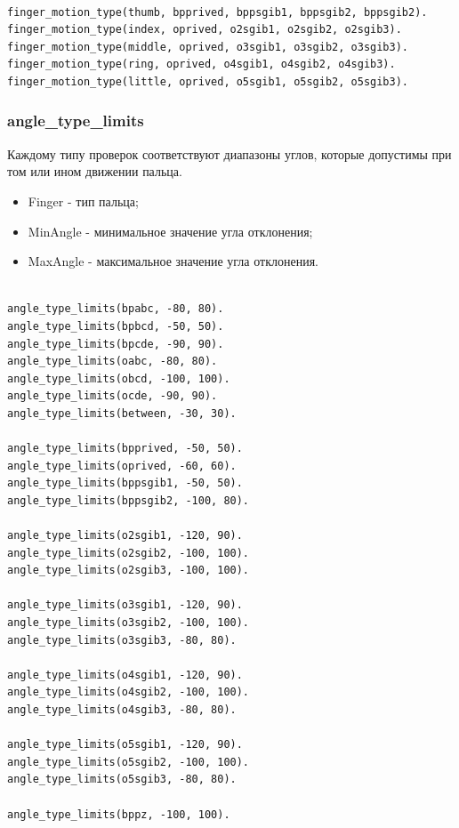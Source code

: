 \begin{lstlisting}[caption=Знания о типах проверок каждого пальца, label=facts:fingermotiontype]
%finger_motion_type(FingerType, AbductionType, Flexion1, Flexion2, Flexion3).

finger_motion_type(thumb, bpprived, bppsgib1, bppsgib2, bppsgib2).
finger_motion_type(index, oprived, o2sgib1, o2sgib2, o2sgib3).
finger_motion_type(middle, oprived, o3sgib1, o3sgib2, o3sgib3).
finger_motion_type(ring, oprived, o4sgib1, o4sgib2, o4sgib3).
finger_motion_type(little, oprived, o5sgib1, o5sgib2, o5sgib3).
\end{lstlisting}

\subsubsection{angle\_type\_limits}
\hspace{0.6cm} Каждому типу проверок соответствуют диапазоны углов, которые допустимы при том или ином движении пальца.

\begin{itemize}
	\item Finger - тип пальца;
	\item MinAngle - минимальное значение угла отклонения;
	\item MaxAngle - максимальное значение угла отклонения.
\end{itemize}

\begin{lstlisting}[caption=Знания об амплитудах углов, label=list:angle_limits]
%angle_type_limits(Finger, MinAngle, MaxAngle)

angle_type_limits(bpabc, -80, 80).
angle_type_limits(bpbcd, -50, 50).
angle_type_limits(bpcde, -90, 90).
angle_type_limits(oabc, -80, 80).
angle_type_limits(obcd, -100, 100).
angle_type_limits(ocde, -90, 90).
angle_type_limits(between, -30, 30).

angle_type_limits(bpprived, -50, 50).
angle_type_limits(oprived, -60, 60).
angle_type_limits(bppsgib1, -50, 50).
angle_type_limits(bppsgib2, -100, 80).

angle_type_limits(o2sgib1, -120, 90).
angle_type_limits(o2sgib2, -100, 100).
angle_type_limits(o2sgib3, -100, 100).

angle_type_limits(o3sgib1, -120, 90).
angle_type_limits(o3sgib2, -100, 100).
angle_type_limits(o3sgib3, -80, 80).

angle_type_limits(o4sgib1, -120, 90).
angle_type_limits(o4sgib2, -100, 100).
angle_type_limits(o4sgib3, -80, 80).

angle_type_limits(o5sgib1, -120, 90).
angle_type_limits(o5sgib2, -100, 100).
angle_type_limits(o5sgib3, -80, 80).

angle_type_limits(bppz, -100, 100).
\end{lstlisting}


